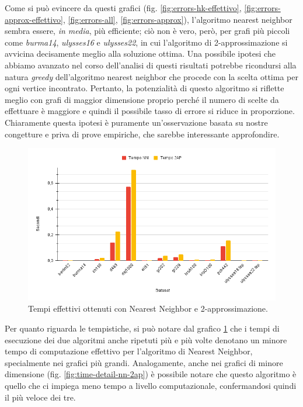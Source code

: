 Come si può evincere da questi grafici (fig. \ref{fig:errors-hk-effettivo}, \ref{fig:errors-approx-effettivo}, \ref{fig:errors-all}, \ref{fig:errors-approx}), l'algoritmo nearest neighbor sembra essere, \textit{in media}, più efficiente; ciò non è vero, però, per grafi più piccoli come \textit{burma14}, \textit{ulysses16} e \textit{ulysses22}, in cui l'algoritmo di 2-approssimazione si avvicina decisamente meglio alla soluzione ottima. 
Una possibile ipotesi che abbiamo avanzato nel corso dell'analisi di questi risultati potrebbe ricondursi alla natura \textit{greedy} dell'algoritmo nearest neighbor che procede con la scelta ottima per ogni vertice incontrato. Pertanto, la potenzialità di questo algoritmo si riflette meglio con grafi di maggior dimensione proprio perché il numero di scelte da effettuare è maggiore e quindi il possibile tasso di errore si riduce in proporzione. Chiaramente questa ipotesi è puramente un'osservazione basata su nostre congetture e priva di prove empiriche, che sarebbe interessante approfondire. 


\begin{figure}[H]
	\centering
	\includegraphics[width=1\textwidth]{res/images/time/time-nn-2ap.png}
	\caption{Tempi effettivi ottenuti con Nearest Neighbor e 2-approssimazione.}
	\label{fig:time-nn-2ap}
\end{figure}

Per quanto riguarda le tempistiche, si può notare dal grafico \ref{fig:time-nn-2ap} che i tempi di esecuzione dei due algoritmi anche ripetuti più e più volte denotano un minore tempo di computazione effettivo per l'algoritmo di Nearest Neighbor, specialmente nei grafici più grandi. 
Analogamente, anche nei grafici di minore dimensione (fig. \ref{fig:time-detail-nn-2ap}) è possibile notare che questo algoritmo è quello che ci impiega meno tempo a livello computazionale, confermandosi quindi il più veloce dei tre. 

